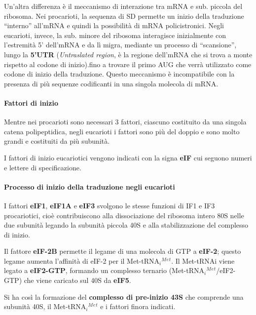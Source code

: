 \documentclass[11pt]{book}
\begin{document}
Un'altra differenza è il meccanismo di interazione tra mRNA e sub.
piccola del ribosoma. Nei procarioti, la sequenza di SD permette un
inizio della traduzione ``interno'' all'mRNA e quindi la possibilità di
mRNA policistronici. Negli eucarioti, invece, la sub. minore del
ribosoma interagisce inizialmente con l'estremità 5' dell'mRNA e da lì
migra, mediante un processo di ``scansione'', lungo la \textbf{5'UTR}
(\emph{Untraslated region}, è la regione dell'mRNA che si trova a monte
rispetto al codone di inizio).fino a trovare il primo AUG che verrà
utilizzato come codone di inizio della traduzione. Questo meccanismo è
incompatibile con la presenza di più sequenze codificanti in una singola
molecola di mRNA.

\paragraph{Fattori di inizio}\label{fattori-di-inizio}

Mentre nei procarioti sono necessari 3 fattori, ciascuno costituito da
una singola catena polipeptidica, negli eucarioti i fattori sono più del
doppio e sono molto grandi e costituiti da più subunità.

I fattori di inizio eucariotici vengono indicati con la signa
\textbf{eIF} cui seguono numeri e lettere di specificazione.

\paragraph{Processo di inizio della traduzione negli
eucarioti}\label{processo-di-inizio-della-traduzione-negli-eucarioti}

I fattori \textbf{eIF1}, \textbf{eIF1A} e \textbf{eIF3} svolgono le
stesse funzioni di IF1 e IF3 procariotici, cioè contribuiscono alla
dissociazione del ribosoma intero 80S nelle due subunità legando la
subunità piccola 40S e alla stabilizzazione del complesso di inizio.

Il fattore \textbf{eIF-2B} permette il legame di una molecola di GTP a
\textbf{eIF-2}; questo legame aumenta l'affinità di eIF-2 per il
Met-tRNA\(_i\)\(^M\)\(^e\)\(^t\). Il Met-tRNAi viene legato a
\textbf{eIF2-GTP}, formando un complesso ternario
(Met-tRNA\(_i\)\(^M\)\(^e\)\(^t\)/eIF2-GTP) che viene caricato sul 40S
da \textbf{eIF5}.

Si ha così la formazione del \textbf{complesso di pre-inizio 43S} che
comprende una subunità 40S, il Met-tRNA\(_i\)\(^M\)\(^e\)\(^t\) e i
fattori finora indicati.
\end{document}
